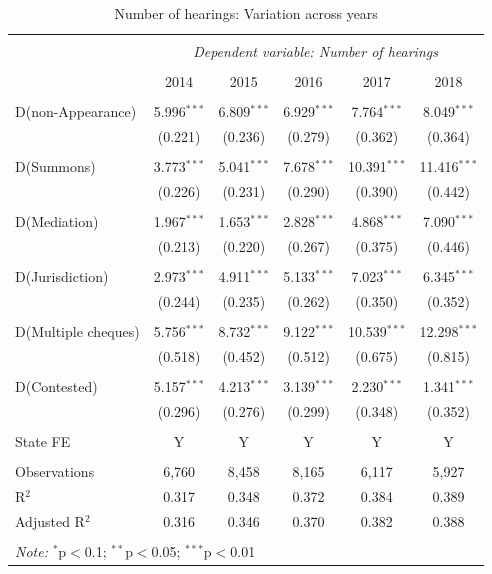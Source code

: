 \pagebreak

 \begin{longtable}{lcc|ccc} 
 \caption{Number of hearings: Variation across years} 
 \\[-1.8ex] 
 \hline \\[-1.8ex] 
 & \multicolumn{5}{c}{\textit{Dependent variable: Number of hearings}} \\ 
 \cline{2-6} 
 \\[-1.8ex] & 2014 & 2015 & 2016 & 2017 & 2018 \\ 
 \hline \\[-1.8ex] 
 D(non-Appearance) & 5.996$^{***}$ & 6.809$^{***}$ & 6.929$^{***}$ & 7.764$^{***}$ & 8.049$^{***}$ \\ 
 & (0.221) & (0.236) & (0.279) & (0.362) & (0.364) \\ 
 & & & & & \\ 
 D(Summons) & 3.773$^{***}$ & 5.041$^{***}$ & 7.678$^{***}$ & 10.391$^{***}$ & 11.416$^{***}$ \\ 
 & (0.226) & (0.231) & (0.290) & (0.390) & (0.442) \\ 
 & & & & & \\ 
 D(Mediation) & 1.967$^{***}$ & 1.653$^{***}$ & 2.828$^{***}$ & 4.868$^{***}$ & 7.090$^{***}$ \\ 
 & (0.213) & (0.220) & (0.267) & (0.375) & (0.446) \\ 
 & & & & & \\ 
 D(Jurisdiction) & 2.973$^{***}$ & 4.911$^{***}$ & 5.133$^{***}$ & 7.023$^{***}$ & 6.345$^{***}$ \\ 
 & (0.244) & (0.235) & (0.262) & (0.350) & (0.352) \\ 
 & & & & & \\ 
 D(Multiple cheques) & 5.756$^{***}$ & 8.732$^{***}$ & 9.122$^{***}$ & 10.539$^{***}$ & 12.298$^{***}$ \\ 
 & (0.518) & (0.452) & (0.512) & (0.675) & (0.815) \\ 
 & & & & & \\ 
 D(Contested) & 5.157$^{***}$ & 4.213$^{***}$ & 3.139$^{***}$ & 2.230$^{***}$ & 1.341$^{***}$ \\ 
 & (0.296) & (0.276) & (0.299) & (0.348) & (0.352) \\ 
 \hline \\[-1.8ex]
 State FE & Y & Y & Y & Y & Y \\
 \hline \\[-1.8ex] 
 Observations & 6,760 & 8,458 & 8,165 & 6,117 & 5,927 \\ 
 R$^{2}$ & 0.317 & 0.348 & 0.372 & 0.384 & 0.389 \\ 
 Adjusted R$^{2}$ & 0.316 & 0.346 & 0.370 & 0.382 & 0.388 \\ 
 \hline \\[-1.8ex] 
 \multicolumn{6}{l}{\textit{Note:} $^{*}$p$<$0.1; $^{**}$p$<$0.05; $^{***}$p$<$0.01} \\ 
 \end{longtable}
 
